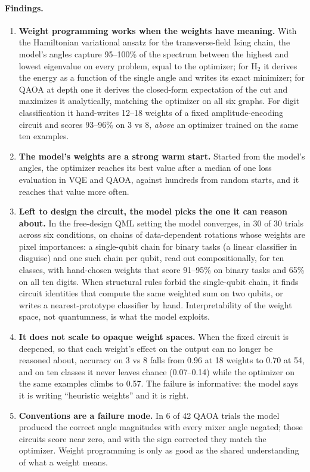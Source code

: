 \paragraph{Findings.}
\begin{enumerate}
  \item \textbf{Weight programming works when the weights have meaning.} With the Hamiltonian variational ansatz for the transverse-field Ising chain, the model's angles capture 95--100\% of the spectrum between the highest and lowest eigenvalue on every problem, equal to the optimizer; for H$_2$ it derives the energy as a function of the single angle and writes its exact minimizer; for QAOA at depth one it derives the closed-form expectation of the cut and maximizes it analytically, matching the optimizer on all six graphs. For digit classification it hand-writes 12--18 weights of a fixed amplitude-encoding circuit and scores 93--96\% on 3 vs 8, \emph{above} an optimizer trained on the same ten examples.
  \item \textbf{The model's weights are a strong warm start.} Started from the model's angles, the optimizer reaches its best value after a median of one loss evaluation in VQE and QAOA, against hundreds from random starts, and it reaches that value more often.
  \item \textbf{Left to design the circuit, the model picks the one it can reason about.} In the free-design QML setting the model converges, in 30 of 30 trials across six conditions, on chains of data-dependent rotations whose weights are pixel importances: a single-qubit chain for binary tasks (a linear classifier in disguise) and one such chain per qubit, read out compositionally, for ten classes, with hand-chosen weights that score 91--95\% on binary tasks and 65\% on all ten digits. When structural rules forbid the single-qubit chain, it finds circuit identities that compute the same weighted sum on two qubits, or writes a nearest-prototype classifier by hand. Interpretability of the weight space, not quantumness, is what the model exploits.
  \item \textbf{It does not scale to opaque weight spaces.} When the fixed circuit is deepened, so that each weight's effect on the output can no longer be reasoned about, accuracy on 3 vs 8 falls from 0.96 at 18 weights to 0.70 at 54, and on ten classes it never leaves chance (0.07--0.14) while the optimizer on the same examples climbs to 0.57. The failure is informative: the model says it is writing ``heuristic weights'' and it is right.
  \item \textbf{Conventions are a failure mode.} In 6 of 42 QAOA trials the model produced the correct angle magnitudes with every mixer angle negated; those circuits score near zero, and with the sign corrected they match the optimizer. Weight programming is only as good as the shared understanding of what a weight means.
\end{enumerate}

